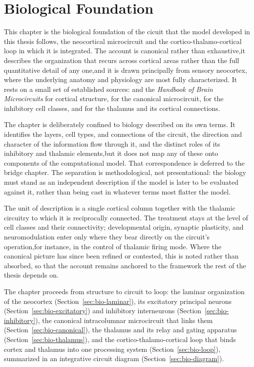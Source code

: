 \usetikzlibrary{arrows.meta}
\chapter{Biological Foundation}
\label{chap:bio}

This chapter is the biological foundation of the cicuit that the model developed in this thesis follows, the neocortical microcircuit 
and the cortico-thalamo-cortical loop in which it is integrated. The account is canonical rather than exhaustive,it describes the 
organization that recurs across cortical areas rather than the full quantitative detail of any one,and it is drawn principally from 
sensory neocortex, where the underlying anatomy and physiology are most fully characterized. It rests on a small set of established 
sources: \textcite{white1989} and the \emph{Handbook of Brain Microcircuits} \parencite{shepherd2018} for cortical structure, 
\textcite{douglas1989, douglas2004} for the canonical microcircuit, \textcite{rudy2011} for the inhibitory cell classes, 
and \textcite{sherman1998, sherman2013} for the thalamus and its cortical connections.

The chapter is deliberately confined to biology described on its own terms. It identifies the layers, cell types, and connections of 
the circuit, the direction and character of the information flow through it, and the distinct roles of its inhibitory and thalamic 
elements,but it does not map any of these onto components of the computational model. That correspondence is deferred to the bridge 
chapter. The separation is methodological, not presentational: the biology must stand as an independent description if the model is 
later to be evaluated against it, rather than being cast in whatever terms most flatter the model.

The unit of description is a single cortical column together with the thalamic circuitry to which it is reciprocally connected. The 
treatment stays at the level of cell classes and their connectivity; developmental origin, synaptic plasticity, and neuromodulation 
enter only where they bear directly on the circuit's operation,for instance, in the control of thalamic firing mode. Where the 
canonical picture has since been refined or contested, this is noted rather than absorbed, so that the account remains anchored to 
the framework the rest of the thesis depends on.

The chapter proceeds from structure to circuit to loop: the laminar organization of the neocortex (Section~\ref{sec:bio-laminar}), 
its excitatory principal neurons (Section~\ref{sec:bio-excitatory}) and inhibitory interneurons (Section~\ref{sec:bio-inhibitory}), 
the canonical intracolumnar microcircuit that links them (Section~\ref{sec:bio-canonical}), the thalamus and its relay and gating 
apparatus (Section~\ref{sec:bio-thalamus}), and the cortico-thalamo-cortical loop that binds cortex and thalamus into one processing 
system (Section~\ref{sec:bio-loop}), summarized in an integrative circuit diagram (Section~\ref{sec:bio-diagram}).

